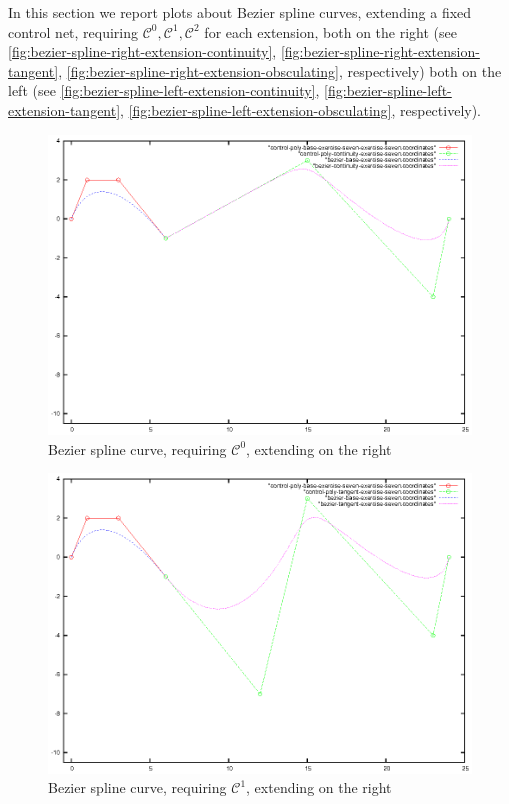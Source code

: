 \documentclass{article}
\begin{document}
In this section we report plots about Bezier spline curves,
extending a fixed control net, requiring $\mathcal{C}^0,
\mathcal{C}^1, \mathcal{C}^2$ for each extension, both on the right
(see
\autoref{fig:bezier-spline-right-extension-continuity},
\autoref{fig:bezier-spline-right-extension-tangent},
\autoref{fig:bezier-spline-right-extension-obsculating},
respectively) both on the left (see
\autoref{fig:bezier-spline-left-extension-continuity},
\autoref{fig:bezier-spline-left-extension-tangent},
\autoref{fig:bezier-spline-left-extension-obsculating},
respectively).

\begin{figure}[h!]
  \centering
  \includegraphics{bezier-deCasteljau-curves/exercise-seven-continuity}
  \caption{Bezier spline curve, requiring $\mathcal{C}^0$, extending on the right}
  \label{fig:bezier-spline-right-extension-continuity}
\end{figure}

\begin{figure}[h!]
  \centering
  \includegraphics{bezier-deCasteljau-curves/exercise-seven-tangent}
  \caption{Bezier spline curve, requiring $\mathcal{C}^1$, extending on the right}
  \label{fig:bezier-spline-right-extension-tangent}
\end{figure}
\end{document}
